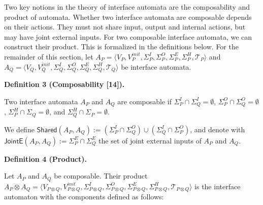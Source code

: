 \documentclass[10pt,a4paper]{article}
\begin{document}
 
 
Two key notions in the theory of interface automata are the composability and product of automata. Whether two interface automata are composable depends on their actions. They must not share input, output and internal actions, but may have joint external inputs. For two composable interface automata, we can construct their product. This is formalized in the definitions below. For the remainder of this section, let $A_{P}=\langle V_{P},V_{P}^{init},\Sigma_{P}^{I},\Sigma_{P}^{O},\Sigma_{P}^{E},\Sigma_{P}^{H},\mathcal{T}_{P}\rangle$ and $A_{Q}=\langle V_{Q},V_{Q}^{init},\Sigma_{Q}^{I},\Sigma_{Q}^{O},\Sigma_{Q}^{E},\Sigma_{Q}^{H},\mathcal{T}_{Q}\rangle$ be interface automata.\par
 
 
 
\par\medskip\noindent\textbf{Definition 3 (Composability [14]).}\par
 
 
Two interface automata $A_{P}$ and $A_{Q}$ are composable if $\Sigma_{P}^{I}\cap\Sigma_{Q}^{I}=\emptyset$, $\Sigma_{P}^{O}\cap\Sigma_{Q}^{O}=\emptyset$, $\Sigma_{P}^{H}\cap\Sigma_{Q}=\emptyset$, and $\Sigma_{Q}^{H}\cap\Sigma_{P}=\emptyset$.\par
 
 
 
We define $\mathsf{Shared}(A_{P},A_{Q}):=(\Sigma_{P}^{I}\cap\Sigma_{Q}^{O})\cup(\Sigma_{Q}^{I}\cap\Sigma_{P}^{O})$, and denote with $\mathsf{JointE}(A_{P},A_{Q}):=\Sigma_{P}^{E}\cap\Sigma_{Q}^{E}$ the set of joint external inputs of $A_{P}$ and $A_{Q}$.\par
 
 
 
 
\par\medskip\noindent\textbf{Definition 4 (Product).}\par
 
 
Let $A_{P}$ and $A_{Q}$ be composable. Their product $A_{P}\otimes A_{Q}=\langle V_{P\otimes Q},V_{P\otimes Q}^{init},\Sigma_{P\otimes Q}^{I},\Sigma_{P\otimes Q}^{O},\Sigma_{P\otimes Q}^{E},\Sigma_{P\otimes Q}^{H},\mathcal{T}_{P\otimes Q}\rangle$ is the interface automaton with the components defined as follows:\par
  
\end{document}
